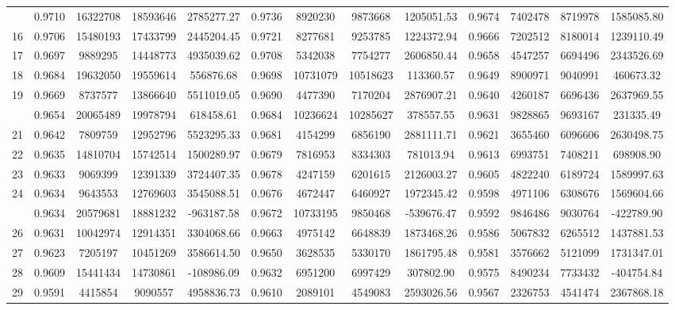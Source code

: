 \documentclass[
  12pt,
]{article}
\begin{document}
\begin{longtable}[t]{lcccccccccccc}
\addlinespace
15 & 0.9710 & 16322708 & 18593646 & 2785277.27 & 0.9736 & 8920230 & 9873668 & 1205051.53 & 0.9674 & 7402478 & 8719978 & 1585085.80\\
16 & 0.9706 & 15480193 & 17433799 & 2445204.45 & 0.9721 & 8277681 & 9253785 & 1224372.94 & 0.9666 & 7202512 & 8180014 & 1239110.49\\
17 & 0.9697 & 9889295 & 14448773 & 4935039.62 & 0.9708 & 5342038 & 7754277 & 2606850.44 & 0.9658 & 4547257 & 6694496 & 2343526.69\\
18 & 0.9684 & 19632050 & 19559614 & 556876.68 & 0.9698 & 10731079 & 10518623 & 113360.57 & 0.9649 & 8900971 & 9040991 & 460673.32\\
19 & 0.9669 & 8737577 & 13866640 & 5511019.05 & 0.9690 & 4477390 & 7170204 & 2876907.21 & 0.9640 & 4260187 & 6696436 & 2637969.55\\
\addlinespace
20 & 0.9654 & 20065489 & 19978794 & 618458.61 & 0.9684 & 10236624 & 10285627 & 378557.55 & 0.9631 & 9828865 & 9693167 & 231335.49\\
21 & 0.9642 & 7809759 & 12952796 & 5523295.33 & 0.9681 & 4154299 & 6856190 & 2881111.71 & 0.9621 & 3655460 & 6096606 & 2630498.75\\
22 & 0.9635 & 14810704 & 15742514 & 1500289.97 & 0.9679 & 7816953 & 8334303 & 781013.94 & 0.9613 & 6993751 & 7408211 & 698908.90\\
23 & 0.9633 & 9069399 & 12391339 & 3724407.35 & 0.9678 & 4247159 & 6201615 & 2126003.27 & 0.9605 & 4822240 & 6189724 & 1589997.63\\
24 & 0.9634 & 9643553 & 12769603 & 3545088.51 & 0.9676 & 4672447 & 6460927 & 1972345.42 & 0.9598 & 4971106 & 6308676 & 1569604.66\\
\addlinespace
25 & 0.9634 & 20579681 & 18881232 & -963187.58 & 0.9672 & 10733195 & 9850468 & -539676.47 & 0.9592 & 9846486 & 9030764 & -422789.90\\
26 & 0.9631 & 10042974 & 12914351 & 3304068.66 & 0.9663 & 4975142 & 6648839 & 1873468.26 & 0.9586 & 5067832 & 6265512 & 1437881.53\\
27 & 0.9623 & 7205197 & 10451269 & 3586614.50 & 0.9650 & 3628535 & 5330170 & 1861795.48 & 0.9581 & 3576662 & 5121099 & 1731347.01\\
28 & 0.9609 & 15441434 & 14730861 & -108986.09 & 0.9632 & 6951200 & 6997429 & 307802.90 & 0.9575 & 8490234 & 7733432 & -404754.84\\
29 & 0.9591 & 4415854 & 9090557 & 4958836.73 & 0.9610 & 2089101 & 4549083 & 2593026.56 & 0.9567 & 2326753 & 4541474 & 2367868.18\\

\end{longtable}
\end{document}
